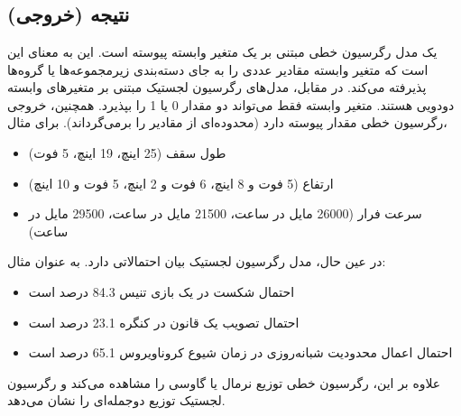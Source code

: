 \documentclass{article}
\begin{document}


\newpage


\section{}%
\subsection{نتیجه (خروجی)}

یک مدل رگرسیون خطی مبتنی بر یک متغیر وابسته پیوسته است. این به معنای این است که متغیر وابسته مقادیر عددی را به جای دسته‌بندی زیرمجموعه‌ها یا گروه‌ها پذیرفته می‌کند. در مقابل، مدل‌های رگرسیون لجستیک مبتنی بر متغیرهای وابسته دودویی هستند. متغیر وابسته فقط می‌تواند دو مقدار 0 یا 1 را بپذیرد. همچنین، خروجی رگرسیون خطی مقدار پیوسته دارد (محدوده‌ای از مقادیر را برمی‌گرداند). برای مثال،
\begin{itemize}
	\item طول سقف (25 اینچ، 19 اینچ، 5 فوت)
	\item ارتفاع (5 فوت و 8 اینچ، 6 فوت و 2 اینچ، 5 فوت و 10 اینچ)
	\item سرعت فرار (26000 مایل در ساعت، 21500 مایل در ساعت، 29500 مایل در ساعت)
\end{itemize}
در عین حال، مدل رگرسیون لجستیک بیان احتمالاتی دارد. به عنوان مثال:
\begin{itemize}
  \item احتمال شکست در یک بازی تنیس 84.3 درصد است
  \item احتمال تصویب یک قانون در کنگره 23.1 درصد است
  \item احتمال اعمال محدودیت شبانه‌روزی در زمان شیوع کروناویروس 65.1 درصد است
\end{itemize}
علاوه بر این، رگرسیون خطی توزیع نرمال یا گاوسی را مشاهده می‌کند و رگرسیون لجستیک توزیع دوجمله‌ای را نشان می‌دهد.
\end{document}

